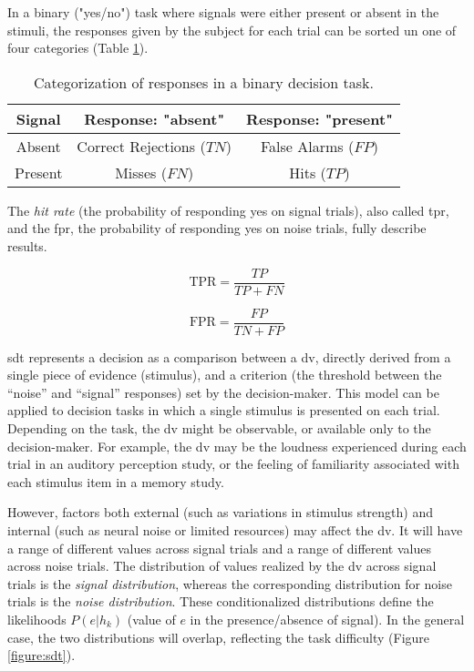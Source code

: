  In a binary ("yes/no") task where signals were either present or absent in the stimuli, the responses given by the subject for each trial can be sorted un one of four categories (Table \ref{table:1}).

\begin{table}[h!]
    \centering
    \begin{tabular}{ ||c||c|c|| }
        \hline
        Signal  & Response: "absent"        & Response: "present" \\
        \hline\hline
        Absent  & Correct Rejections ($TN$) & False Alarms ($FP$) \\
        \hline
        Present & Misses ($FN$)             & Hits ($TP$)         \\
        \hline
    \end{tabular}
    \caption{Categorization of responses in a binary decision task.}
    \label{table:1}
\end{table}

The \textit{hit rate} (the probability of responding yes on signal trials), also called \acrfull{tpr}, and the \acrfull{fpr}, the probability of responding yes on noise trials, fully describe results.

$$\text{TPR} = \frac{TP}{TP + FN}$$

$$\text{FPR} = \frac{FP}{TN+FP}$$

\acrshort{sdt} represents a decision as a comparison between a \acrfull{dv}, directly derived from a single piece of evidence (stimulus), and a criterion (the threshold between the “noise” and “signal” responses) set by the decision-maker. This model can be applied to decision tasks in which a single stimulus is presented on each trial. Depending on the task, the \acrshort{dv} might be observable, or available only to the decision-maker. For example, the \acrshort{dv} may be the loudness experienced during each trial in an auditory perception study, or the feeling of familiarity associated with each stimulus item in a memory study.

However, factors both external (such as variations in stimulus strength) and internal (such as neural noise or limited resources) may affect the \acrshort{dv}. It will have a range of different values across signal trials and a range of different values across noise trials. The distribution of values realized by the \acrshort{dv} across signal trials is the \textit{signal distribution}, whereas the corresponding distribution for noise trials is the \textit{noise distribution}. These conditionalized distributions define the likelihoods $P(e|h_k)$ (value of $e$ in the presence/absence of signal). In the general case, the two distributions will overlap, reflecting the task difficulty (Figure \ref{figure:sdt}).

